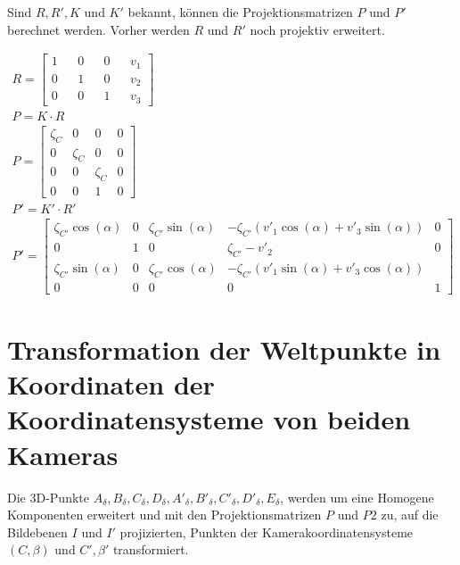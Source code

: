 Sind $R,R',K$ und $K'$ bekannt, können die Projektionsmatrizen $P$ und $P'$ berechnet werden. Vorher werden $R$ und $R'$ noch projektiv erweitert.


\begin{gather}
R=
\begin{bmatrix}
1&&0&&0&&v_1\\
0&&1&&0&&v_2\\
0&&0&&1&&v_3
\end{bmatrix}\\
P = K\cdot R \\
P =
\begin{bmatrix}
\zeta_{C}&0&0&0\\
0&\zeta_{C}&0&0\\
0&0&\zeta_{C}&0\\
0&0&1&0
\end{bmatrix}\\
P' = K' \cdot R'\\
P' =
\begin{bmatrix}
\zeta_{C'} \cos(\alpha)&0&\zeta_{C'} \sin(\alpha)&-\zeta_{C'} (v'_1\cos(\alpha)+v'_3\sin(\alpha) )&0\\
0&1&0&\zeta_{C'}-v'_2&0\\
\zeta_{C'}\sin(\alpha)&0&\zeta_{C'}\cos(\alpha)&-\zeta_{C'}(v'_1\sin(\alpha)+v'_3\cos(\alpha))\\
0&0&0&0&1
\end{bmatrix}
\end{gather}



\section{Transformation der Weltpunkte in Koordinaten der Koordinatensysteme von beiden Kameras}

Die 3D-Punkte $A_\delta,B_\delta,C_\delta,D_\delta,A'_\delta,B'_\delta,C'_\delta,D'_\delta, E_\delta$, werden um eine Homogene Komponenten erweitert und mit den Projektionsmatrizen \ensuremath{P} und \ensuremath{P2} zu, auf die Bildebenen $I$ und $I'$ projizierten, Punkten der Kamerakoordinatensysteme $(C,\beta)$ und $C',\beta'$ transformiert.

